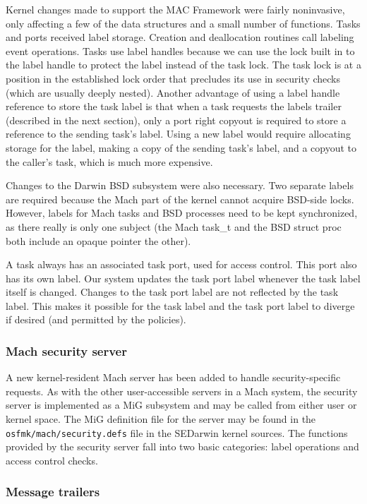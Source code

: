 Kernel changes made to support the MAC Framework were fairly
noninvasive, only affecting a few of the data structures and a small
number of functions.  Tasks and ports received label storage.
Creation and deallocation routines call labeling event operations.
Tasks use label handles because we can use the lock built in to the
label handle to protect the label instead of the task lock. The task
lock is at a position in the established lock order that precludes its
use in security checks (which are usually deeply nested).  Another
advantage of using a label handle reference to store the task label is
that when a task requests the labels trailer (described in the next
section), only a port right copyout is required to store a reference
to the sending task's label.  Using a new label would require
allocating storage for the label, making a copy of the sending task's
label, and a copyout to the caller's task, which is much more
expensive.

Changes to the Darwin BSD subsystem were also necessary.  Two separate
labels are required because the Mach part of the kernel cannot acquire
BSD-side locks.  However, labels for Mach tasks and BSD processes need
to be kept synchronized, as there really is only one subject (the Mach
task\_t and the BSD struct proc both include an opaque pointer the
other).

A task always has an associated task port, used for access control.
This port also has its own label.  Our system updates the task port
label whenever the task label itself is changed.  Changes to the
task port label are not reflected by the task label.  This makes it
possible for the task label and the task port label to diverge if
desired (and permitted by the policies).

\subsubsection{Mach security server}

A new kernel-resident Mach server has been added to handle security-specific
requests.  As with the other user-accessible servers in a Mach
system, the security server is implemented as a MiG subsystem and
may be called from either user or kernel space.  The MiG definition
file for the server may be found in the {\tt osfmk/mach/security.defs}
file in the SEDarwin kernel sources.  The functions provided by the
security server fall into two basic categories: label operations
and access control checks.

\subsubsection{Message trailers}

